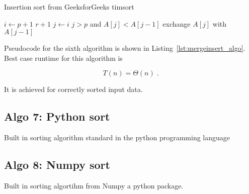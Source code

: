 \begin{algorithm}[H]
  \caption{Insertion sort from GeeksforGeeks timsort}
  \label{lst:insert_algo}
  \begin{codebox}
    \li \For $i \gets p+1$ \To $r+1$
    \li \Do $j \gets i$
    \li 	\While $j>p$ and $A[j]<A[j-1]$
    \li		\Do exchange $A[j]$ with $A[j-1]$
    \End
    \End		
  \end{codebox}
\end{algorithm}

Pseudocode for the sixth algorithm is shown in
Listing~\ref{lst:mergeinsert_algo}. Best case runtime for this algorithm
is

\begin{equation}
  T(n) = \Theta(n) \;.  \label{eq:ins_sort_best}
\end{equation}

It is achieved for correctly sorted input data.

\subsection{Algo 7: Python sort}\label{sec:algo7}

Built in sorting algorithm standard in the python programming language

\subsection{Algo 8: Numpy sort}\label{sec:algo8}

Built in sorting algortihm from Numpy a python package.
